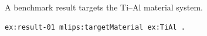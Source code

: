 A benchmark result targets the Ti--Al material system.
\begin{lstlisting}[language=turtle]
ex:result-01 mlips:targetMaterial ex:TiAl .
\end{lstlisting}
